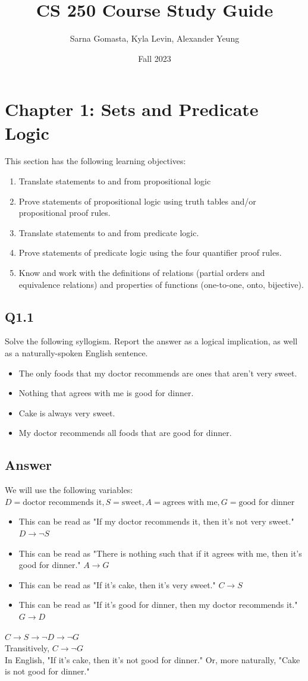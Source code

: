 \documentclass{article}
\title{CS 250 Course Study Guide}
\author{Sarna Gomasta, Kyla Levin, Alexander Yeung}
\date{Fall 2023}
\begin{document}
\maketitle

\section*{Chapter 1: Sets and Predicate Logic}
This section has the following learning objectives:
\begin{enumerate}
    \item Translate statements to and from propositional logic
    \item Prove statements of propositional logic using truth tables and/or propositional proof rules.
    \item Translate statements to and from predicate logic.
    \item Prove statements of predicate logic using the four quantifier proof rules.
    \item Know and work with the definitions of relations (partial orders and equivalence relations) and properties of functions (one-to-one, onto, bijective).
\end{enumerate}
\subsection*{Q1.1}
Solve the following syllogism. Report the answer as a logical implication, as well as a naturally-spoken English sentence.
\begin{itemize}
    \item The only foods that my doctor recommends are ones that aren't very sweet.
    \item Nothing that agrees with me is good for dinner.
    \item Cake is always very sweet.
    \item My doctor recommends all foods that are good for dinner.
\end{itemize}
\newpage
\subsection*{Answer}
We will use the following variables: $D=\text{doctor recommends it},S=\text{sweet},A=\text{agrees with me},G=\text{good for dinner}$
\begin{itemize}
    \item This can be read as "If my doctor recommends it, then it's not very sweet." $D\rightarrow \neg S$
    \item This can be read as "There is nothing such that if it agrees with me, then it's good for dinner." $A\rightarrow G$
    \item This can be read as "If it's cake, then it's very sweet." $C\rightarrow S$
    \item This can be read as "If it's good for dinner, then my doctor recommends it." $G\rightarrow D$
\end{itemize}
$C\rightarrow S\rightarrow \neg D\rightarrow\neg G$
\\ Transitively, $C\rightarrow\neg G$
\\ In English, "If it's cake, then it's not good for dinner." Or, more naturally, "Cake is not good for dinner."
\newpage
\end{document}
